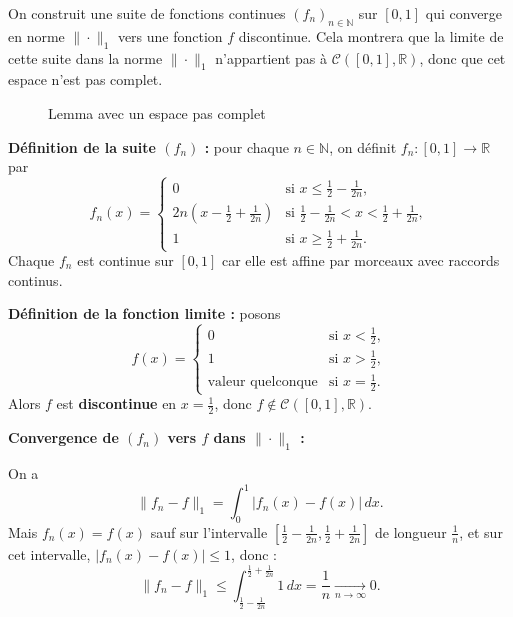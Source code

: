 \begin{preuve}
    On construit une suite de fonctions continues $(f_n)_{n \in \mathbb{N}}$ sur $[0,1]$ qui converge en norme $\| \cdot \|_1$ vers une fonction $f$ discontinue. Cela montrera que la limite de cette suite dans la norme $\| \cdot \|_1$ n’appartient pas à $\mathcal{C}([0,1], \mathbb{R})$, donc que cet espace n’est pas complet.
    
\begin{figure}[H]
    \centering
    \caption{Lemma avec un espace pas complet}
    \label{fig:lemma-n-est-pas-complet}
\end{figure}

\medskip

\textbf{Définition de la suite $(f_n)$ :} pour chaque $n \in \mathbb{N}$, on définit $f_n : [0,1] \to \mathbb{R}$ par
\[
f_n(x) = 
\begin{cases}
0 & \text{si } x \le \frac{1}{2} - \frac{1}{2n}, \\[4pt]
2n\left(x - \frac{1}{2} + \frac{1}{2n}\right) & \text{si } \frac{1}{2} - \frac{1}{2n} < x < \frac{1}{2} + \frac{1}{2n}, \\[4pt]
1 & \text{si } x \ge \frac{1}{2} + \frac{1}{2n}.
\end{cases}
\]
Chaque $f_n$ est continue sur $[0,1]$ car elle est affine par morceaux avec raccords continus.

\medskip

\textbf{Définition de la fonction limite :} posons
\[
f(x) = 
\begin{cases}
0 & \text{si } x < \frac{1}{2}, \\
1 & \text{si } x > \frac{1}{2}, \\
\text{valeur quelconque} & \text{si } x = \frac{1}{2}.
\end{cases}
\]
Alors $f$ est \textbf{discontinue} en $x = \frac{1}{2}$, donc $f \notin \mathcal{C}([0,1], \mathbb{R})$.

\medskip

\textbf{Convergence de $(f_n)$ vers $f$ dans $\| \cdot \|_1$ :}

On a
\[
\|f_n - f\|_1 = \int_0^1 |f_n(x) - f(x)|\, dx.
\]
Mais $f_n(x) = f(x)$ sauf sur l’intervalle $\left[\frac{1}{2} - \frac{1}{2n}, \frac{1}{2} + \frac{1}{2n}\right]$ de longueur $\frac{1}{n}$, et sur cet intervalle, $|f_n(x) - f(x)| \le 1$, donc :
\[
\|f_n - f\|_1 \le \int_{\frac{1}{2} - \frac{1}{2n}}^{\frac{1}{2} + \frac{1}{2n}} 1\, dx = \frac{1}{n} \xrightarrow[n \to \infty]{} 0.
\]


\end{preuve}
